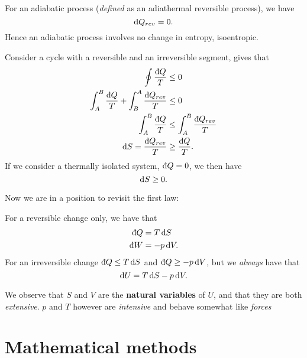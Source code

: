 \begin{prop}
For an adiabatic process (\textit{defined} as an adiathermal reversible process), 
we have
\begin{equation}
\dif Q_{rev}=0. 
\end{equation}
Hence an adiabatic process involves no change in entropy, \ie isoentropic. 
\end{prop}

\begin{thrm}
Consider a cycle with a reversible and an irreversible segment, 
 gives that 
\begin{equation}
\begin{aligned}
	\oint\frac{\indiff Q}{T}&\leq0 \\
	\int^B_A\frac{\indiff Q}{T}+\int^A_B\frac{\indiff Q_{rev}}{T}&\leq0 \\
	\int^B_A\frac{\indiff Q}{T}&\leq\int^B_A\frac{\indiff Q_{rev}}{T} \\
	\dif S = \frac{\indiff Q_{rev}}{T}&\geq\frac{\indiff Q}{T}. 
\end{aligned}
\end{equation}
If we consider a thermally isolated system, \ie $\indiff Q=0$, we then have
\begin{equation}
	\dif S \geq0. 
\end{equation}
\end{thrm}

Now we are in a position to revisit the first law: 
\begin{thrm}
For a reversible change only, we have that 
\begin{subequations}
\begin{align}
\indiff Q&=T\dif S \\
\indiff W&=-p\dif V. 
\end{align}
\end{subequations}
For an irreversible change $\indiff Q\leq T\dif S$ and $\indiff Q\geq-p\dif V$, but we \textit{always} have that 
\begin{equation}
\dif U=T\dif S-p\dif V. 
\end{equation}
\end{thrm}
We observe that $S$ and $V$ are the \textbf{natural variables} of $U$, 
and that they are both \textit{extensive}. 
$p$ and $T$ however are \textit{intensive} and behave somewhat like \textit{forces}
\section{Mathematical methods}
